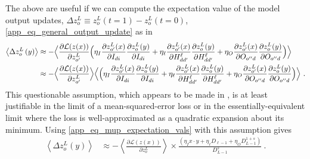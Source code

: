 The above are useful if we can compute the expectation value of the model output updates, $
\Delta z^{ L }_{ o }\equiv z^{ L }_{ o }(t=1) -z^{ L }_{ o }(t=0) $,
\eqref{app_eq_general_output_update} as in
\begin{align}
    \left \langle \Delta z^{ L }_{ o }\left ( y \right ) \right \rangle &\approx
    - \Big \langle \frac{ \partial \mathcal{L}(z(x)) }{\partial z ^{ L }_{ o' }  }\Big( \eta_{ I } \frac{ \partial z ^{ L }_{ o' }(x) }{ \partial I_{ di } }\frac{ \partial z^{ L }_{ o }(y) }{ \partial I_{ di } }
    + \eta_{ \ell }\frac{ \partial z ^{ L }_{ o' }(x) }{ \partial H^{ \ell }_{ dd' } }\frac{ \partial z^{ L }_{ o }(y) }{ \partial H^{ \ell }_{ dd' } }
    + \eta_{ O }\frac{ \partial z ^{ L }_{ o' }(x) }{ \partial O_{ o''d } }\frac{ \partial z^{ L }_{ o }(y) }{ \partial O_{ o''d  } } \Big ) \Big \rangle\nonumber\\
    &\approx
    - \Big \langle \frac{ \partial \mathcal{L}(z(x)) }{\partial z ^{ L }_{ o' }  }\Big\rangle \Big\langle\Big( \eta_{ I } \frac{ \partial z ^{ L }_{ o' }(x) }{ \partial I_{ di } }\frac{ \partial z^{ L }_{ o }(y) }{ \partial I_{ di } }
    + \eta_{ \ell }\frac{ \partial z ^{ L }_{ o' }(x) }{ \partial H^{ \ell }_{ dd' } }\frac{ \partial z^{ L }_{ o }(y) }{ \partial H^{ \ell }_{ dd' } }
    + \eta_{ O }\frac{ \partial z ^{ L }_{ o' }(x) }{ \partial O_{ o''d } }\frac{ \partial z^{ L }_{ o }(y) }{ \partial O_{ o''d  } } \Big ) \Big \rangle \ .
\end{align}
This questionable assumption, which appears to be made in \cite{yang2022tensor}, is at least
justifiable in the limit of a mean-squared-error loss or in the essentially-equivalent limit where
the loss is well-approximated as a quadratic expansion about its minimum. Using
\eqref{app_eq_mup_expectation_vals} with this assumption gives
\begin{align}
    \left \langle \Delta z^{ L }_{ o }\left ( y \right ) \right \rangle &\approx
    - \left \langle \frac{ \partial \mathcal{L}(z(x)) }{\partial z ^{ L }_{ o }  }\right\rangle \times  \frac{ \left ( \eta_{ I } x \cdot y
    + \eta_{ \ell }  D_{ \ell-1 }
+ \eta_{ O }D^{1+s}_{ L-1 } \right )}{D^{ s }_{ L-1 }} \ . \label{app_eq_deltaz_scaling}
\end{align}


